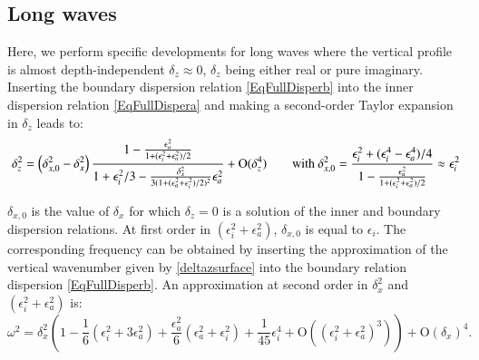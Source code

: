 \subsection{Long waves}
\label{SubSectionLongWavesrealdz}
Here, we perform specific developments for long waves where the vertical profile is almost depth-independent $\delta_z \approx 0$, $\delta_z$ being either real or pure imaginary.
Inserting the boundary dispersion relation \ref{EqFullDisperb} into the inner dispersion relation \ref{EqFullDispera} and making a second-order Taylor expansion in $\delta_z$ leads to:
\begin{equation}
	\delta_z^2=\left(
	\delta_{x,0}^2-\delta_x^2
	\right)
	\frac{1-\frac{\epsilon_a^2}{1+(\epsilon_i^2+\epsilon_a^2)/2}}{1+\epsilon_i^2/3-\frac{\delta_x^2}{3(1+(\epsilon_a^2+\epsilon_i^2)/2)^2}\epsilon_a^2}+\mathrm{O}(\delta_z^4)
\qquad\hbox{with }
\delta_{x,0}^2
=
\frac{\epsilon_i^2+(\epsilon_i^4-\epsilon_a^4)/4}{1-\frac{\epsilon_a^2}{1+(\epsilon_i^2+\epsilon_a^2)/2}}
\approx \epsilon_i^2
	\label{deltazsurface}
\end{equation}

%
$\delta_{x,0}$ is the value of $\delta_x$ for which $\delta_z=0$ is a solution of the inner and boundary dispersion relations. At first order in $(\epsilon_i^2+\epsilon_a^2)$, $\delta_{x,0}$ is equal to $\epsilon_i$.
The corresponding frequency can be obtained by inserting the approximation of the vertical wavenumber given by \ref{deltazsurface} into the boundary relation dispersion \ref{EqFullDisperb}. An approximation at second order in $\delta_x^2$ and $(\epsilon_i^2+\epsilon_a^2)$ is:
\begin{equation}
	\omega^2 = \delta_x^2 \left(
	1
	-\frac{1}{6}\left(
	\epsilon_i^2+3\epsilon_a^2
	\right)
	+\frac{\epsilon_a^2}{6}\left(\epsilon_a^2+\epsilon_i^2\right)+\frac{1}{45}\epsilon_i^4
	+\mathrm{O}((\epsilon_i^2+\epsilon_a^2)^3)
	\right)
	+\mathrm{O}(\delta_x)^4.
	\label{eqomegalongwavereal}
\end{equation}
%
